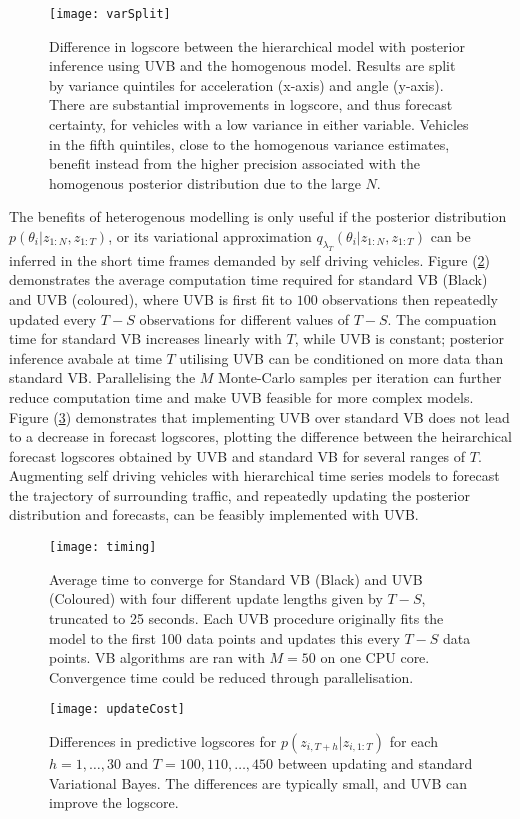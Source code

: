 \documentclass[12pt,a4paper]{article}\usepackage[]{graphicx}\usepackage[]{color}
\begin{document}
\begin{figure}[h]
\centering
\texttt{[image: varSplit]}
\caption{Difference in logscore between the hierarchical model with posterior inference using UVB and the homogenous model. Results are split by variance quintiles for acceleration (x-axis) and angle (y-axis). There are substantial improvements in logscore, and thus forecast certainty, for vehicles with a low variance in either variable. Vehicles in the fifth quintiles, close to the homogenous variance estimates, benefit instead from the higher precision associated with the homogenous posterior distribution due to the large $N$.}
\label{fig:varSplit}
\end{figure}

The benefits of heterogenous modelling is only useful if the posterior distribution $p(\theta_{i} | z_{1:N}, z_{1:T})$, or its variational approximation $q_{\lambda_T}(\theta_{i} | z_{1:N}, z_{1:T})$ can be inferred in the short time frames demanded by self driving vehicles. Figure (\ref{fig:timing}) demonstrates the average computation time required for standard VB (Black) and UVB (coloured), where UVB is first fit to $100$ observations then repeatedly updated every $T-S$ observations for different values of $T-S$. The compuation time for standard VB increases linearly with $T$, while UVB is constant; posterior inference avabale at time $T$ utilising UVB can be conditioned on more data than standard VB. 
Parallelising the $M$ Monte-Carlo samples per iteration can further reduce computation time and make UVB feasible for more complex models. Figure (\ref{fig:updateCost}) demonstrates that implementing UVB over standard VB does not lead to a decrease in forecast logscores, plotting the difference between the heirarchical forecast logscores obtained by UVB and standard VB for several ranges of $T$. Augmenting self driving vehicles with hierarchical time series models to forecast the trajectory of surrounding traffic, and repeatedly updating the posterior distribution and forecasts, can be feasibly implemented with UVB.
\begin{figure}[htp]
\centering
\texttt{[image: timing]}
\caption{Average time to converge for Standard VB (Black) and UVB (Coloured) with four different update lengths given by $T - S$, truncated to 25 seconds. Each UVB procedure originally fits the model to the first 100 data points and updates this every $T - S$ data points. VB algorithms are ran with $M = 50$ on one CPU core. Convergence time could be reduced through parallelisation.}
\label{fig:timing}
\end{figure}
\begin{figure}[htp]
\centering
\texttt{[image: updateCost]}
\caption{Differences in predictive logscores for $p(z_{i, T+h} | z_{i, 1:T})$ for each $h = 1, \dots, 30$ and $T = 100, 110, \dots, 450$ between updating and standard Variational Bayes. The differences are typically small, and UVB can improve the logscore.}
\label{fig:updateCost}
\end{figure}
\end{document}
